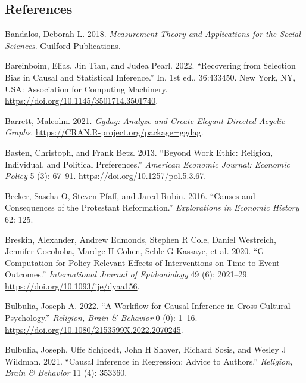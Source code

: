 \documentclass[
  singlecolumn]{article}
\newlength{\cslhangindent}
\newlength{\cslentryspacingunit} %
\newenvironment{CSLReferences}[2] %
 {%
  \setlength{\parindent}{0pt}
  \ifodd #1
  \let\oldpar\par
  \def\par{\hangindent=\cslhangindent\oldpar}
  \fi
  \setlength{\parskip}{#2\cslentryspacingunit}
 }%
 {}
\begin{document}
\newpage{}

\hypertarget{references}{%
\subsection*{References}\label{references}}

\hypertarget{refs}{}
\begin{CSLReferences}{1}{0}
\leavevmode{}%
Bandalos, Deborah L. 2018. \emph{Measurement Theory and Applications for
the Social Sciences}. Guilford Publications.

\leavevmode{}%
Bareinboim, Elias, Jin Tian, and Judea Pearl. 2022. {``Recovering from
Selection Bias in Causal and Statistical Inference.''} In, 1st ed.,
36:433450. New York, NY, USA: Association for Computing Machinery.
\url{https://doi.org/10.1145/3501714.3501740}.

\leavevmode{}%
Barrett, Malcolm. 2021. \emph{Ggdag: Analyze and Create Elegant Directed
Acyclic Graphs}. \url{https://CRAN.R-project.org/package=ggdag}.

\leavevmode{}%
Basten, Christoph, and Frank Betz. 2013. {``Beyond Work Ethic: Religion,
Individual, and Political Preferences.''} \emph{American Economic
Journal: Economic Policy} 5 (3): 67--91.
\url{https://doi.org/10.1257/pol.5.3.67}.

\leavevmode{}%
Becker, Sascha O, Steven Pfaff, and Jared Rubin. 2016. {``Causes and
Consequences of the Protestant Reformation.''} \emph{Explorations in
Economic History} 62: 125.

\leavevmode{}%
Breskin, Alexander, Andrew Edmonds, Stephen R Cole, Daniel Westreich,
Jennifer Cocohoba, Mardge H Cohen, Seble G Kassaye, et al. 2020.
{``G-Computation for Policy-Relevant Effects of Interventions on
Time-to-Event Outcomes.''} \emph{International Journal of Epidemiology}
49 (6): 2021--29. \url{https://doi.org/10.1093/ije/dyaa156}.

\leavevmode{}%
Bulbulia, Joseph A. 2022. {``A Workflow for Causal Inference in
Cross-Cultural Psychology.''} \emph{Religion, Brain \& Behavior} 0 (0):
1--16. \url{https://doi.org/10.1080/2153599X.2022.2070245}.

\leavevmode{}%
Bulbulia, Joseph, Uffe Schjoedt, John H Shaver, Richard Sosis, and
Wesley J Wildman. 2021. {``Causal Inference in Regression: Advice to
Authors.''} \emph{Religion, Brain \& Behavior} 11 (4): 353360.


\end{CSLReferences}
\end{document}
